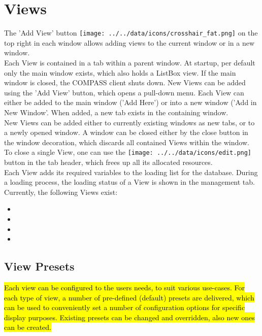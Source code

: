 \section{Views}
The 'Add View' button \texttt{[image: ../../data/icons/crosshair\_fat.png]} on the top right in each window allows adding views to the current window or in a new window. \\

Each View is contained in a tab within a parent window.  At startup, per default only the main window exists, which also holds
a ListBox view. If the main window is closed, the COMPASS client shuts down. New Views can be added using the 'Add View' button, which opens a pull-down menu. Each View can either be added to the main window ('Add Here') or into a new window ('Add in New Window'. When added, a new tab exists in the containing window. \\

New Views can be added either to currently existing windows as new tabs, or to a newly opened window. A window can be closed either by the close button in the window decoration, which discards all contained Views within the window.  \\

To close a single View, one can use the \texttt{[image: ../../data/icons/edit.png]} button in the tab header, which frees up all its allocated resources. \\

Each View adds its required variables to the loading list for the database. During a loading process, the loading status  of a View is shown in the management tab.\\

Currently, the following Views exist:
\begin{itemize}
 \item {}
 \item {}
 \item {}
 \item {}
\end{itemize}

\subsection{View Presets}

\hl{Each view can be configured to the users needs, to suit various use-cases. For each type of view, a number of pre-defined (default) presets are delivered, which can be used to conveniently set a number of configuration options for specific display purposes. Existing presets can be changed and overridden, also new ones can be created.} \\

